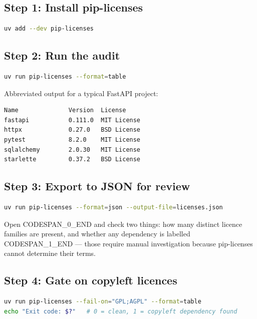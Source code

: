 \documentclass[11pt,a4paper]{book}
\begin{document}
\subsection{Step 1: Install pip-licenses}

\begin{lstlisting}[language=Bash]
uv add --dev pip-licenses
\end{lstlisting}

\subsection{Step 2: Run the audit}

\begin{lstlisting}[language=Bash]
uv run pip-licenses --format=table
\end{lstlisting}

Abbreviated output for a typical FastAPI project:

\begin{lstlisting}
Name              Version  License
fastapi           0.111.0  MIT License
httpx             0.27.0   BSD License
pytest            8.2.0    MIT License
sqlalchemy        2.0.30   MIT License
starlette         0.37.2   BSD License
\end{lstlisting}

\subsection{Step 3: Export to JSON for review}

\begin{lstlisting}[language=Bash]
uv run pip-licenses --format=json --output-file=licenses.json
\end{lstlisting}

Open CODESPAN\_0\_END and check two things: how many distinct licence families are present, and whether any dependency is labelled CODESPAN\_1\_END --- those require manual investigation because pip-licenses cannot determine their terms.

\subsection{Step 4: Gate on copyleft licences}

\begin{lstlisting}[language=Bash]
uv run pip-licenses --fail-on="GPL;AGPL" --format=table
echo "Exit code: $?"   # 0 = clean, 1 = copyleft dependency found
\end{lstlisting}
\end{document}

